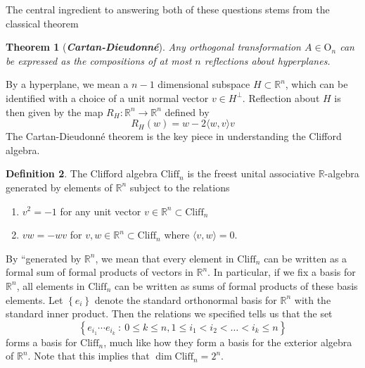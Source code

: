 \documentclass[psamsfonts, 12pt]{amsart}
\newtheorem{thm}{Theorem}[section]
\theoremstyle{definition}
\newtheorem{defn}[thm]{Definition}
\theoremstyle{remark}
\newcommand{\R}{\mathbb{R}}
\newcommand{\ib}[1]{\textbf{\textit{#1}}}
\newcommand{\Cliff}{\mathrm{Cliff}}
\newcommand{\set}[1]{\left\lbrace #1 \right\rbrace}
\begin{document}
%
The central ingredient to answering both of these questions stems from the classical
theorem
%
\begin{thm}[\ib{Cartan-Dieudonn\'e}]
Any orthogonal transformation $A \in \mathrm{O}_n$ can be expressed as the compositions
of at most $n$ reflections about hyperplanes.
\end{thm}
%
By a hyperplane, we mean a $n-1$ dimensional subspace $H \subset \R^n$, which can be
identified with a choice of a unit normal vector $v \in H^\perp$. Reflection about $H$
is then given by the
map $R_H : \R^n \to \R^n$ defined by
\[
R_H(w) = w - 2\langle w,v\rangle v
\]
The Cartan-Dieudonn\'e theorem is the key piece in understanding the Clifford algebra.
%
\begin{defn}
The Clifford algebra $\Cliff_n$ is the freest unital associative $\R$-algebra generated
by elements of $\R^n$ subject to  the relations
\begin{enumerate}
  \item $v^2 = -1$ for any unit vector $v \in \R^n \subset \Cliff_n$
  \item $vw = -wv$ for $v,w \in \R^n \subset \Cliff_n$ where $\langle v,w \rangle = 0$.
\end{enumerate}
\end{defn}
%
By ``generated by $\R^n$, we mean that every element in $\Cliff_n$ can be written as a
formal sum of formal products of vectors in $\R^n$. In particular, if we fix a basis for
$\R^n$, all elements in $\Cliff_n$ can be written as sums of formal products of these
basis elements. Let $\set{e_i}$ denote the standard orthonormal basis for $\R^n$ with
the standard inner product. Then the relations we specified tells us that the set
\[
\set{e_{i_1}\cdots e_{i_k} ~:~ 0 \leq k \leq n, 1 \leq i_1 < i_2 < \ldots < i_k \leq n}
\]
forms a basis for $\Cliff_n$, much like how they form a basis for the exterior algebra of
$\R^n$. Note that this implies that $\dim \Cliff_n = 2^n$. \\
\end{document}
